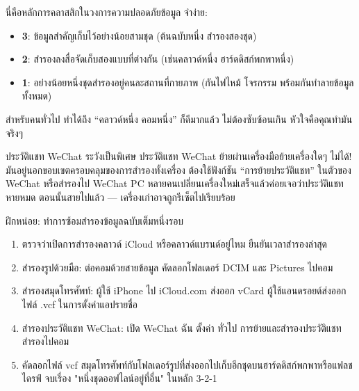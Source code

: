 
นี่คือหลักการคลาสสิกในวงการความปลอดภัยข้อมูล จำง่าย:

\begin{itemize}
  \item \textbf{3}: ข้อมูลสำคัญเก็บไว้อย่างน้อยสามชุด (ต้นฉบับหนึ่ง สำรองสองชุด)
  \item \textbf{2}: สำรองลงสื่อจัดเก็บสองแบบที่ต่างกัน (เช่นคลาวด์หนึ่ง ฮาร์ดดิสก์พกพาหนึ่ง)
  \item \textbf{1}: อย่างน้อยหนึ่งชุดสำรองอยู่คนละสถานที่กายภาพ (กันไฟไหม้ โจรกรรม พร้อมกันทำลายข้อมูลทั้งหมด)
\end{itemize}

สำหรับคนทั่วไป ทำได้ถึง “คลาวด์หนึ่ง คอมหนึ่ง” ก็ดีมากแล้ว ไม่ต้องซับซ้อนเกิน หัวใจคือคุณทำมันจริงๆ

\begin{tcbwarn}{ประวัติแชท WeChat ระวังเป็นพิเศษ}
ประวัติแชท WeChat ย้ายผ่านเครื่องมือย้ายเครื่องใดๆ ไม่ได้! มันอยู่นอกขอบเขตครอบคลุมของการสำรองทั้งเครื่อง ต้องใช้ฟังก์ชัน “การย้ายประวัติแชท” ในตัวของ WeChat หรือสำรองไป WeChat PC หลายคนเปลี่ยนเครื่องใหม่เสร็จแล้วค่อยเจอว่าประวัติแชทหายหมด ตอนนั้นสายไปแล้ว — เครื่องเก่าอาจถูกรีเซ็ตไปเรียบร้อย

\end{tcbwarn}

\begin{tcbpractice}{ฝึกหน่อย: ทำการซ้อมสำรองข้อมูลฉบับเต็มหนึ่งรอบ}
\begin{enumerate}
  \item ตรวจว่าเปิดการสำรองคลาวด์ iCloud หรือคลาวด์แบรนด์อยู่ไหม ยืนยันเวลาสำรองล่าสุด
  \item สำรองรูปด้วยมือ: ต่อคอมด้วยสายข้อมูล คัดลอกโฟลเดอร์ DCIM และ Pictures ไปคอม
  \item สำรองสมุดโทรศัพท์: ผู้ใช้ iPhone ไป iCloud.com ส่งออก vCard ผู้ใช้แอนดรอยด์ส่งออกไฟล์ .vcf ในการตั้งค่าแอปรายชื่อ
  \item สำรองประวัติแชท WeChat: เปิด WeChat ฉัน ตั้งค่า ทั่วไป การย้ายและสำรองประวัติแชท สำรองไปคอม
  \item คัดลอกไฟล์ vcf สมุดโทรศัพท์กับโฟลเดอร์รูปที่ส่งออกไปเก็บอีกชุดบนฮาร์ดดิสก์พกพาหรือแฟลชไดรฟ์ จบเรื่อง "หนึ่งชุดออฟไลน์อยู่ที่อื่น" ในหลัก 3-2-1
\end{enumerate}

\end{tcbpractice}
